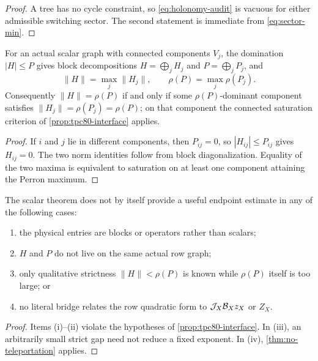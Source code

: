 \begin{proof}
A tree has no cycle constraint, so
\eqref{eq:holonomy-audit} is vacuous for either admissible switching
sector.  The second statement is immediate from
\eqref{eq:sector-min}.
\end{proof}

\begin{proposition}
\label{prop:reducible-holonomy}
For an actual scalar graph with connected components \(V_j\), the
domination \(|H|\le P\) gives block decompositions
\(H=\bigoplus_jH_j\) and \(P=\bigoplus_jP_j\), and
\[
 \|H\|=\max_j\|H_j\|,
 \qquad
 \rho(P)=\max_j\rho(P_j).
\]
Consequently \(\|H\|=\rho(P)\) if and only if some
\(\rho(P)\)-dominant component satisfies
\(\|H_j\|=\rho(P_j)=\rho(P)\); on that component the connected
saturation criterion of \cref{prop:tpc80-interface} applies.
\end{proposition}

\begin{proof}
If \(i\) and \(j\) lie in different components, then \(P_{ij}=0\), so
\(|H_{ij}|\le P_{ij}\) gives \(H_{ij}=0\).  The two norm identities
follow from block diagonalization.  Equality of the two maxima is
equivalent to saturation on at least one component attaining the
Perron maximum.
\end{proof}

\begin{proposition}
\label{prop:tpc80-boundary}
The scalar theorem does not by itself provide a useful endpoint
estimate in any of the following cases:
\begin{enumerate}[label=(\roman*),leftmargin=2.2em]
\item the physical entries are blocks or operators rather than
scalars;
\item \(H\) and \(P\) do not live on the same actual row graph;
\item only qualitative strictness
\(\|H\|<\rho(P)\) is known while \(\rho(P)\) itself is too large; or
\item no literal bridge relates the row quadratic form to
\(\mathcal J_X\mathcal B_Xz_X\) or \(Z_X\).
\end{enumerate}
\end{proposition}

\begin{proof}
Items (i)--(ii) violate the hypotheses of
\cref{prop:tpc80-interface}.  In (iii), an arbitrarily small strict
gap need not reduce a fixed exponent.  In (iv),
\cref{thm:no-teleportation} applies.
\end{proof}
